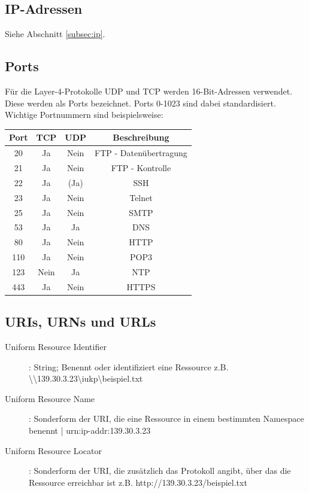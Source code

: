 \documentclass{article} %
\begin{document}

\subsection{IP-Adressen}

Siehe Abschnitt \ref{subsec:ip}.

\subsection{Ports}

Für die Layer-4-Protokolle UDP und TCP werden 16-Bit-Adressen verwendet.
Diese werden als Ports bezeichnet.
Ports 0-1023 sind dabei standardisiert.
Wichtige Portnummern sind beispielsweise:
\begin{center}
\begin{tabular}{|c|c|c|c|}
	\hline Port & TCP & UDP & Beschreibung \\ 
	\hline 20 & Ja & Nein & FTP - Datenübertragung \\ 
	\hline 21 & Ja & Nein & FTP - Kontrolle \\ 
	\hline 22 & Ja & (Ja) & SSH \\ 
	\hline 23 & Ja & Nein & Telnet \\ 
	\hline 25 & Ja & Nein & SMTP \\ 
	\hline 53 & Ja & Ja & DNS \\ 
	\hline 80 & Ja & Nein & HTTP \\ 
	\hline 110 & Ja & Nein & POP3 \\ 
	\hline 123 & Nein & Ja & NTP \\ 
	\hline 443 & Ja & Nein & HTTPS \\ 
	\hline 
\end{tabular} 
\end{center}
\subsection{URIs, URNs und URLs}
\begin{description}
\item [Uniform Resource Identifier]: String; Benennt oder identifiziert eine Ressource z.B.  \textbackslash\textbackslash139.30.3.23\textbackslash iukp\textbackslash beispiel.txt
\item [Uniform Resource Name]: Sonderform der URI, die eine Ressource in einem bestimmten
Namespace benennt | urn:ip-addr:139.30.3.23
\item [Uniform Resource Locator]: Sonderform der URI, die zusätzlich das Protokoll angibt, über das die Ressource erreichbar ist z.B. http://139.30.3.23/beispiel.txt
\end{description}
\end{document}
